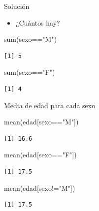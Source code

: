 \documentclass[
  ignorenonframetext,
  aspectratio=169,
  spanish,
]{beamer}
\newenvironment{Shaded}{\begin{snugshade}}{\end{snugshade}}
\newcommand{\FunctionTok}[1]{\textcolor[rgb]{0.28,0.35,0.67}{#1}}
\newcommand{\NormalTok}[1]{\textcolor[rgb]{0.00,0.23,0.31}{#1}}
\newcommand{\SpecialCharTok}[1]{\textcolor[rgb]{0.37,0.37,0.37}{#1}}
\newcommand{\StringTok}[1]{\textcolor[rgb]{0.13,0.47,0.30}{#1}}
\providecommand{\tightlist}{%
  \setlength{\itemsep}{0pt}\setlength{\parskip}{0pt}}
\begin{document}
\begin{frame}[fragile]{Solución}
\label{soluciuxf3n}
\begin{itemize}
\tightlist
\item
  ¿Cuántos hay?
\end{itemize}

\begin{Shaded}
\begin{Highlighting}[]
\FunctionTok{sum}\NormalTok{(sexo}\SpecialCharTok{==}\StringTok{"M"}\NormalTok{)}
\end{Highlighting}
\end{Shaded}

\begin{verbatim}
[1] 5
\end{verbatim}

\begin{Shaded}
\begin{Highlighting}[]
\FunctionTok{sum}\NormalTok{(sexo}\SpecialCharTok{==}\StringTok{"F"}\NormalTok{)}
\end{Highlighting}
\end{Shaded}

\begin{verbatim}
[1] 4
\end{verbatim}
\end{frame}

\begin{frame}[fragile]{Media de edad para cada sexo}
\label{media-de-edad-para-cada-sexo}
\begin{Shaded}
\begin{Highlighting}[]
\FunctionTok{mean}\NormalTok{(edad[sexo}\SpecialCharTok{==}\StringTok{"M"}\NormalTok{])  }
\end{Highlighting}
\end{Shaded}

\begin{verbatim}
[1] 16.6
\end{verbatim}

\begin{Shaded}
\begin{Highlighting}[]
\FunctionTok{mean}\NormalTok{(edad[sexo}\SpecialCharTok{==}\StringTok{"F"}\NormalTok{]) }
\end{Highlighting}
\end{Shaded}

\begin{verbatim}
[1] 17.5
\end{verbatim}

\begin{Shaded}
\begin{Highlighting}[]
\FunctionTok{mean}\NormalTok{(edad[sexo}\SpecialCharTok{!=}\StringTok{"M"}\NormalTok{]) }
\end{Highlighting}
\end{Shaded}

\begin{verbatim}
[1] 17.5
\end{verbatim}
\end{frame}
\end{document}
